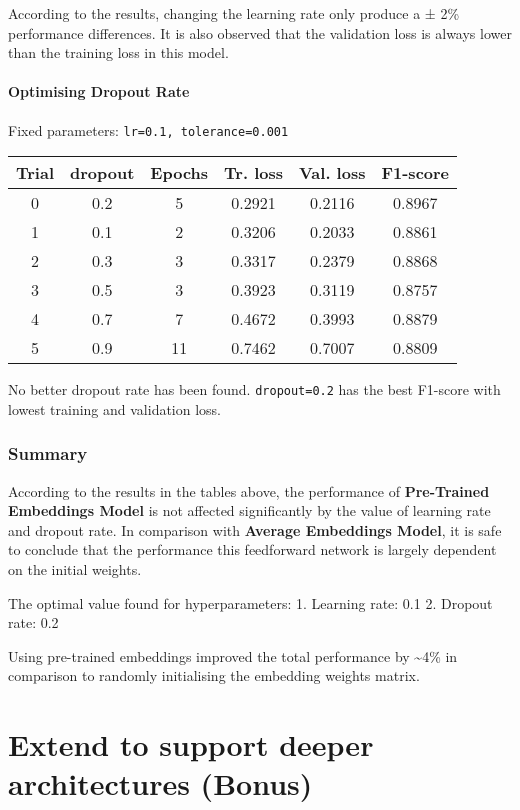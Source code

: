 \documentclass[11pt]{article}
\begin{document}
According to the results, changing the learning rate only produce a ±
2\% performance differences. It is also observed that the validation
loss is always lower than the training loss in this model.

\hypertarget{optimising-dropout-rate}{%
\paragraph{Optimising Dropout Rate}\label{optimising-dropout-rate}}

Fixed parameters: \texttt{lr=0.1,\ tolerance=0.001}

\begin{longtable}[]{@{}cccccc@{}}
\toprule
Trial & dropout & Epochs & Tr. loss & Val. loss &
F1-score\tabularnewline
\midrule
\endhead
0 & 0.2 & 5 & 0.2921 & 0.2116 & 0.8967\tabularnewline
1 & 0.1 & 2 & 0.3206 & 0.2033 & 0.8861\tabularnewline
2 & 0.3 & 3 & 0.3317 & 0.2379 & 0.8868\tabularnewline
3 & 0.5 & 3 & 0.3923 & 0.3119 & 0.8757\tabularnewline
4 & 0.7 & 7 & 0.4672 & 0.3993 & 0.8879\tabularnewline
5 & 0.9 & 11 & 0.7462 & 0.7007 & 0.8809\tabularnewline
\bottomrule
\end{longtable}

No better dropout rate has been found. \texttt{dropout=0.2} has the best
F1-score with lowest training and validation loss.

\hypertarget{summary}{%
\subsubsection{Summary}\label{summary}}

According to the results in the tables above, the performance of
\textbf{Pre-Trained Embeddings Model} is not affected significantly by
the value of learning rate and dropout rate. In comparison with
\textbf{Average Embeddings Model}, it is safe to conclude that the
performance this feedforward network is largely dependent on the initial
weights.

The optimal value found for hyperparameters: 1. Learning rate: 0.1 2.
Dropout rate: 0.2

Using pre-trained embeddings improved the total performance by
\textasciitilde4\% in comparison to randomly initialising the embedding
weights matrix.

    \hypertarget{extend-to-support-deeper-architectures-bonus}{%
\section{Extend to support deeper architectures
(Bonus)}\label{extend-to-support-deeper-architectures-bonus}}
\end{document}
